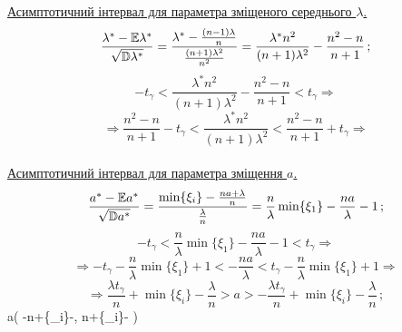 \documentclass[14pt,a4paper]{scrartcl}
\begin{document}
\newpage
\underline{Асимптотичний інтервал для параметра зміщеного середнього $\lambda$.}\\
$$\frac{\lambda^*-\mathbb{E}\lambda^*}{\sqrt{\mathbb{D}\lambda^*}}=
\frac{\lambda^*-\frac{(n-1)\lambda}n}{\frac{(n+1)\lambda^2}{n^2}}=
\frac{\lambda^*n^2}{(n+1)\lambda^2}-\frac{n^2-n}{n+1}\,;$$
$$-t_\gamma<\frac{\lambda^*n^2}{(n+1)\lambda^2}-\frac{n^2-n}{n+1}<t_\gamma\Rightarrow$$
$$\Rightarrow\frac{n^2-n}{n+1}-t_\gamma<
\frac{\lambda^*n^2}{(n+1)\lambda^2}
<\frac{n^2-n}{n+1}+t_\gamma\Rightarrow$$
$$$$
\\



\underline{Асимптотичний інтервал для параметра зміщення $a$.}\\
$$\frac{a^*-\mathbb{E} a^*}{\sqrt{\mathbb{D} a^*}}=
\frac{\min\{\xi_i\}-\frac{na+\lambda}{n}}{\frac{\lambda}n}=
\frac{n}\lambda\min\{\xi_1\}-\frac{na}\lambda-1\,;$$
$$-t_\gamma<\frac{n}\lambda\min\{\xi_1\}-\frac{na}\lambda-1<t_\gamma\Rightarrow$$
$$\Rightarrow-t_\gamma-\frac{n}\lambda\min\{\xi_1\}+1<
-\frac{na}\lambda<
t_\gamma-\frac{n}\lambda\min\{\xi_1\}+1\Rightarrow$$
$$\Rightarrow\frac{\lambda t_\gamma}n+\min\{\xi_i\}-\frac\lambda{n}
>a>
-\frac{\lambda t_\gamma}n+\min\{\xi_i\}-\frac\lambda{n}\,;$$
\be a\in\left(
-n+\min\{\xi_i\}-\frac{},\quad
{}n+\min\{\xi_i\}-\frac{}
\right)\ee
\end{document}
